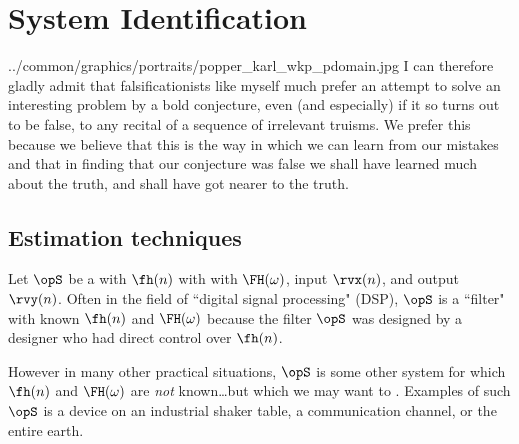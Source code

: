 \chapter{System Identification}
  {../common/graphics/portraits/popper_karl_wkp_pdomain.jpg}
  {%
  I can therefore gladly admit that falsificationists like myself much
  prefer an attempt to solve an interesting problem by a bold conjecture,
  even (and especially) if it so turns out to be false,
  to any recital of a sequence of irrelevant truisms.
  We prefer this because we believe that this is the way in which we can
  learn from our mistakes and that in finding that our conjecture was false
  we shall have learned much about the truth,
  and shall have got nearer to the truth.
  }

\section{Estimation techniques}
Let $\opS$ be a  with  $\fh(n)$ with
with  $\FH(\omega)$,
input $\rvx(n)$, and output $\rvy(n)$.
Often in the field of ``digital signal processing" (DSP), $\opS$ is a ``filter"
with known $\fh(n)$ and $\FH(\omega)$ because the filter $\opS$ was
designed by a designer who had direct control over $\fh(n)$.

However in many other practical situations, $\opS$ is some other system
for which $\fh(n)$ and $\FH(\omega)$ are \emph{not} known\ldots but which we may
want to . Examples of such $\opS$ is a
device on an industrial shaker table, a communication channel, or the entire earth.


